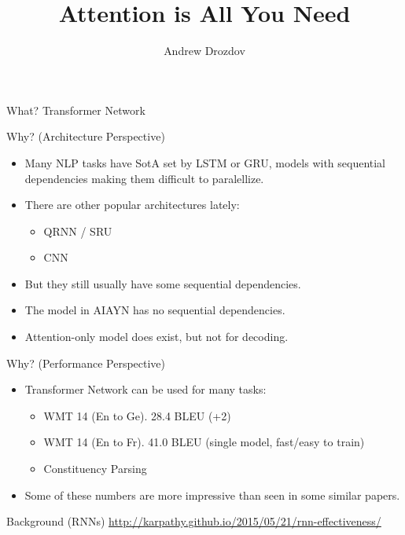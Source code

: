 \documentclass{beamer}
\title[AIAYN]{Attention is All You Need}
\author{Andrew Drozdov}
\begin{document}
\begin{frame}
  \titlepage
\end{frame}

\begin{frame}{What?}{}
Transformer Network
\end{frame}

\begin{frame}{Why? (Architecture Perspective)}{}
\begin{itemize}
\item Many NLP tasks have SotA set by LSTM or GRU, models with sequential dependencies making them difficult to paralellize.

\item There are other popular architectures lately:
\begin{itemize}
\item QRNN / SRU
\item CNN
\end{itemize}
\item[] But they still usually have some sequential dependencies.

\item The model in AIAYN has no sequential dependencies.

\item Attention-only model does exist, but not for decoding.

\end{itemize}
\end{frame}

\begin{frame}{Why? (Performance Perspective)}{}
\begin{itemize}
\item Transformer Network can be used for many tasks:
\begin{itemize}
\item WMT 14 (En to Ge). 28.4 BLEU (+2)
\item WMT 14 (En to Fr). 41.0 BLEU (single model, fast/easy to train)
\item Constituency Parsing
\end{itemize}

\item[] Some of these numbers are more impressive than seen in some similar papers.

\end{itemize}
\end{frame}

\begin{frame}{Background (RNNs)}{}
\url{http://karpathy.github.io/2015/05/21/rnn-effectiveness/}
\end{frame}
\end{document}
